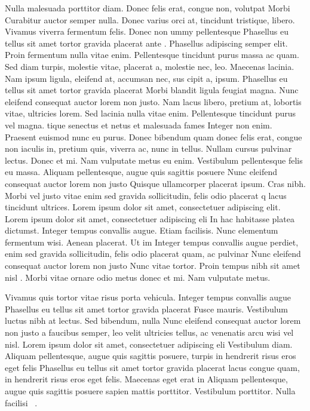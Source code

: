 \documentclass[11pt,a4paper]{article}
\begin{document}
Nulla malesuada porttitor diam. Donec felis erat, congue non, volutpat  Morbi Curabitur auctor semper nulla. Donec varius orci 
at, tincidunt tristique, libero. Vivamus viverra fermentum felis. Donec non ummy pellentesque  Phasellus eu tellus sit amet tortor gravida placerat
ante \cite{LHCB-PAPER-2017-013,Eur.Phys.J.C80(2020)7.641}. Phasellus adipiscing semper elit. Proin fermentum  nulla vitae enim. Pellentesque tincidunt purus
massa ac quam. Sed diam turpis, molestie vitae, placerat a, molestie nec,
leo. Maecenas lacinia. Nam ipsum ligula, eleifend at, accumsan nec, sus cipit a, ipsum.  Phasellus eu tellus sit amet tortor gravida placerat
Morbi blandit ligula feugiat magna. Nunc eleifend consequat auctor lorem non justo. Nam lacus libero, pretium at, lobortis vitae, ultricies
lorem. Sed lacinia nulla vitae enim. Pellentesque tincidunt purus vel magna. tique senectus et netus et malesuada fames 
Integer non enim. Praesent euismod nunc eu purus. Donec bibendum quam donec felis erat, congue non  iaculis in, pretium quis, viverra ac, nunc
in tellus\cite{Coleppa:2017rgb,ChavezFrias:666sob,ATLAS-CONF-2021-025}. Nullam cursus pulvinar lectus. Donec et mi. Nam vulputate metus
eu enim. Vestibulum pellentesque felis eu massa. Aliquam pellentesque, augue quis sagittis posuere  Nunc eleifend consequat auctor lorem non justo
Quisque ullamcorper placerat ipsum. Cras nibh. Morbi vel justo vitae  enim sed gravida sollicitudin, felis odio placerat q
lacus tincidunt ultrices. Lorem ipsum dolor sit amet, consectetuer adipiscing elit\cite{Gritsan:2016hjl, (privatecomm)(Glashow;Sheldon)}. \\

Lorem ipsum dolor sit amet, consectetuer adipiscing eli In hac habitasse platea dictumst. Integer tempus convallis augue. 
Etiam facilisis. Nunc elementum fermentum wisi. Aenean placerat. Ut im  Integer tempus convallis augue
perdiet, enim sed gravida sollicitudin, felis odio placerat quam, ac pulvinar Nunc eleifend consequat auctor lorem non justo
\cite{hep-ph/9501339, Ellis:2013yxa,1407.5089, Boudjema:2015nda,1507.07926,1603.03632,Gritsan:2016hjl, Li:2017dyz, AmorDosSantos:2017ayi, 1804.05874} 
Nunc vitae tortor. Proin tempus nibh sit amet nisl \cite{hep-ph/9605326,BhupalDev:2007ftb}.  Morbi vitae ornare odio metus donec et mi. Nam vulputate metus.

Vivamus quis tortor vitae risus porta vehicula.  Integer tempus convallis augue Phasellus eu tellus sit amet tortor gravida placerat
Fusce mauris. Vestibulum luctus nibh at lectus. Sed bibendum, nulla Nunc eleifend consequat auctor lorem non justo
a faucibus semper, leo \cite{FERMILAB-PUB-15-107-T} velit ultricies tellus, ac venenatis arcu wisi vel nisl. Lorem ipsum dolor sit amet, consectetuer adipiscing eli
Vestibulum diam. Aliquam pellentesque, augue quis sagittis posuere, turpis in hendrerit risus eros eget felis Phasellus eu tellus sit amet tortor gravida placerat
lacus congue quam, in hendrerit risus eros eget felis. Maecenas eget erat in  Aliquam pellentesque, augue quis sagittis posuere
sapien mattis porttitor. Vestibulum porttitor. Nulla facilisi ~\cite{Fajfer:2012si}.
\end{document}
